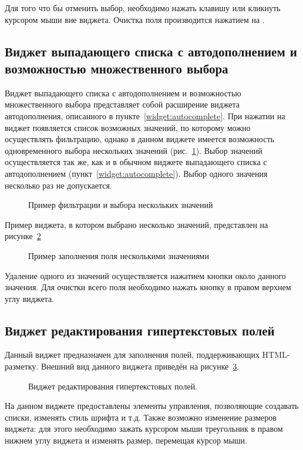  Для того что бы отменить выбор, необходимо нажать клавишу \keys{\esc} или кликнуть курсором мыши вне виджета. Очистка поля производится нажатием на .
\subsection{Виджет выпадающего списка с автодополнением и возможностью множественного выбора}
\label{widget:autocomplete_with_multiselect}
Виджет выпадающего списка с автодополнением и возможностью множественного выбора представляет собой расширение виджета автодополнения, описанного в пункте~\ref{widget:autocomplete}. При нажатии на виджет появляется список возможных значений, по которому можно осуществлять фильтрацию, однако в данном виджете имеется возможность одновременного выбора нескольких значений (рис.~\ref{img:widgect:mutliselect_filter_view}). Выбор значений осуществляется так же, как и в обычном виджете выпадающего списка с автодополнением (пункт~\ref{widget:autocomplete}). Выбор одного значения несколько раз не допускается.
\begin{figure}[H]
	\caption{Пример фильтрации и выбора нескольких значений}
	\label{img:widgect:mutliselect_filter_view}
\end{figure}
 Пример виджета, в котором выбрано несколько значений, представлен на рисунке~\ref{img:widgect:mutliselect_multi_view}
 \begin{figure}[H]
 	\caption{Пример заполнения поля несколькими значениями}
 	\label{img:widgect:mutliselect_multi_view}
 \end{figure}
 
 Удаление одного из значений осуществляется нажатием кнопки \quotes{$\times$} около данного значения. Для очистки всего поля необходимо нажать кнопку \quotes{$\times$} в правом верхнем углу виджета.
 
\subsection{Виджет редактирования гипертекстовых полей}
\label{widget:ckeditor}
Данный виджет предназначен для заполнения полей, поддерживающих HTML-разметку. Внешний вид данного виджета приведён на рисунке~\ref{img:widget:ckeditor}.
\begin{figure}[H]
	\caption{Виджет редактирования гипертекстовых полей.}
	\label{img:widget:ckeditor}
\end{figure}
На данном виджете предоставлены элементы управления, позволяющие создавать списки, изменять стиль шрифта и т.д. Также возможно изменение размеров виджета: для этого необходимо зажать курсором мыши треугольник в правом нижнем углу виджета и изменять размер, перемещая курсор мыши.
